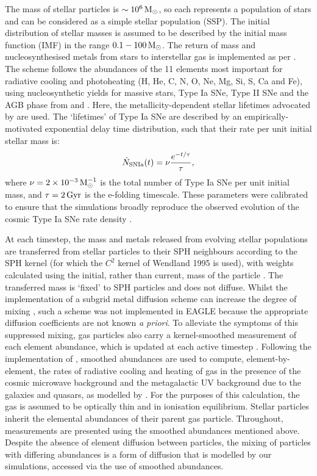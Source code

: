 The mass of stellar particles is $\sim 10^6\,{\rm M}_\odot$, so each represents a population of stars and can be considered as a simple stellar population (SSP). The initial distribution of stellar masses is assumed to be described by the \citet{2003PASP..115..763C} initial mass function (IMF) in the range $0.1-100\,{\rm M}_\odot$. The return of mass and nucleosynthesised metals from stars to interstellar gas is implemented as per \citet{2009MNRAS.399..574W}. The scheme follows the abundances of the 11 elements most important for radiative cooling and photoheating (H, He, C, N, O, Ne, Mg, Si, S, Ca and Fe), using nucleosynthetic yields for massive stars, Type Ia SNe, Type II SNe and the AGB phase from \cite{1998A&A...334..505P} and \cite{2001A&A...370..194M}. Here, the metallicity-dependent stellar lifetimes advocated by \citet{1998A&A...334..505P} are used. The `lifetimes' of Type Ia SNe are described by an empirically-motivated exponential delay time distribution, such that their rate per unit initial stellar mass is:
\begin{equation}
\dot{N}_{\rm SNIa}(t) = \nu \frac{e^{-t/\tau}}{\tau},
\end{equation}
where $\nu = 2\times 10^{-3}\,{\rm M}_{\odot}^{-1}$ is the total number of Type Ia SNe per unit initial mass, and $\tau = 2\,{\rm Gyr}$ is the e-folding timescale. These parameters were calibrated to ensure that the simulations broadly reproduce the observed evolution of the cosmic Type Ia SNe rate density \citep{2015MNRAS.446..521S}.  

At each timestep, the mass and metals released from evolving stellar populations are transferred from stellar particles to their SPH neighbours according to the SPH kernel (for which the $C^2$ kernel of Wendland 1995 is used), with weights calculated using the initial, rather than current, mass of the particle \citep[see Section 4.4 of][]{2015MNRAS.446..521S}. The transferred mass is `fixed' to SPH particles and does not diffuse. Whilst the implementation of a subgrid metal diffusion scheme can increase the degree of mixing \citep{2009MNRAS.392.1381G,2010MNRAS.407.1581S}, such a scheme was not implemented in EAGLE because the appropriate diffusion coefficients are not known \emph{a priori}. To alleviate the symptoms of this suppressed mixing, gas particles also carry a kernel-smoothed measurement of each element abundance, which is updated at each active timestep \citep[for a detailed discussion, see][]{2009MNRAS.399..574W}. Following the implementation of \citet{2009MNRAS.393...99W}, smoothed abundances are used to compute, element-by-element, the rates of radiative cooling and heating of gas in the presence of the cosmic microwave background and the metagalactic UV background due to the galaxies and quasars, as modelled by \citet{2001cghr.confE..64H}. For the purposes of this calculation, the gas is assumed to be optically thin and in ionisation equilibrium. Stellar particles inherit the elemental abundances of their parent gas particle. Throughout, measurements are presented using the smoothed abundances mentioned above. Despite the absence of element diffusion between particles, the mixing of particles with differing abundances is a form of diffusion that is modelled by our simulations, accessed via the use of smoothed abundances.

